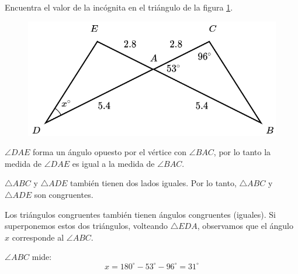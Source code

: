Encuentra el valor de la incógnita en el triángulo de la figura \ref{fig:angle_triangle_35}.

\begin{minipage}[t][][t]{0.35\textwidth}
    \begin{figure}[H]
        \centering
        \includegraphics[width=\linewidth]{../images/angle_triangle_35.png}
        \caption{}
        \label{fig:angle_triangle_35}
    \end{figure}
\end{minipage}\hfill
\begin{minipage}[t][][t]{0.6\textwidth}
    \begin{solutionbox}{4.5cm}
        $\angle DAE$ forma un ángulo opuesto por el vértice con $\angle BAC$, por lo tanto la medida de $\angle DAE$ es igual a la medida de $\angle BAC$.

        $\triangle ABC$ y $\triangle ADE$ también tienen dos lados iguales. Por lo tanto,
        $\triangle ABC$ y $\triangle ADE$ son congruentes.

        Los triángulos congruentes también tienen ángulos congruentes (iguales). Si superponemos estos dos triángulos, volteando $\triangle EDA$, observamos que el ángulo $x$ corresponde al $\angle ABC$.

        $\angle ABC$ mide: \[x=180^\circ-53^\circ-96^\circ=31^\circ\]
    \end{solutionbox}
\end{minipage}
